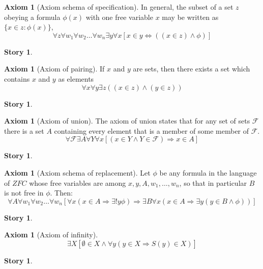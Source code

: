 \documentclass[11pt]{report}
\theoremstyle{plain} %
\theoremstyle{definition}
\newtheorem{axiom}[thm]{Axiom}%
\newtheorem{st}[thm]{Story}%
\theoremstyle{remark}
\newcommand{\set}[1]{\{#1\}}
\begin{document}
\begin{axiom}[Axiom schema of specification]
  In general, the subset of a set \(z\) obeying a formula \(\phi(x)\) with one free variable \(x\) may be written as \(\set{x \in z : \phi(x)}\),
  \[\forall z \forall w_1 \forall w_2 \dots \forall w_n \exists y \forall x [x \in y \iff ((x \in z) \land \phi)]\]
\end{axiom}
\begin{st}
  
\end{st}

\begin{axiom}[Axiom of pairing]
  If \(x\) and \(y\) are sets, then there exists a set which contains \(x\) and \(y\) as elements
  \[\forall x \forall y \exists z ((x \in z) \land (y \in z))\]
\end{axiom}
\begin{st}
  
\end{st}

\begin{axiom}[Axiom of union]
  The axiom of union states that for any set of sets \(\mathcal{F}\) there is a set \(A\) containing every element that is a member of some member of \(\mathcal{F}\).
  \[\forall \mathcal{F} \exists A \forall Y \forall x [(x \in Y \land Y \in \mathcal{F}) \Rightarrow x \in A]\]
\end{axiom}
\begin{st}
  
\end{st}

\begin{axiom}[Axiom schema of replacement]
  Let \(\phi\) be any formula in the language of \(ZFC\) whose free variables are among \(x,y,A,w_1,\dots,w_n\), so that in particular \(B\) is not free in \(\phi\). Then:
  \[\forall A \forall w_1 \forall w_2 \dots \forall w_n [ \forall x (x \in A \Rightarrow \exists! y \phi) \Rightarrow \exists B \forall x (x \in A \Rightarrow \exists y (y \in B \land \phi)) ] \]
\end{axiom}
\begin{st}
  
\end{st}

\begin{axiom}[Axiom of infinity]
  \[\exists X [\emptyset \in X \land \forall y (y \in X \Rightarrow S(y) \in X)]\]
\end{axiom}
\begin{st}
  
\end{st}
\end{document}
